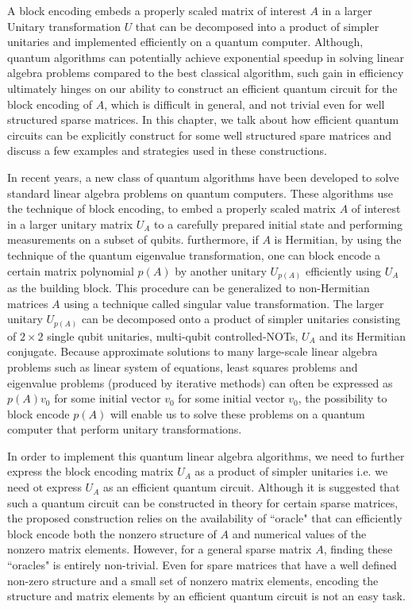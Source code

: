 \documentclass[12pt, oneside]{book}
\theoremstyle{definition}
\theoremstyle{definition}
\theoremstyle{remark}
\begin{document}
A block encoding embeds a properly scaled matrix of interest $A$ in a larger Unitary transformation $U$ that can be decomposed into a product of simpler unitaries and implemented efficiently on a quantum computer. Although, quantum algorithms can potentially achieve exponential speedup in solving linear algebra problems compared to the best classical algorithm, such gain in efficiency ultimately hinges on our ability to construct an efficient quantum circuit for the block encoding of $A$, which is difficult in general, and not trivial even for well structured sparse matrices. In this chapter, we talk about how efficient quantum circuits can be explicitly construct for some well structured spare matrices and discuss a few examples and strategies used in these constructions.

In recent years, a new class of quantum algorithms have been developed to solve standard linear algebra problems on quantum computers. These algorithms use the technique of block encoding, to embed a properly scaled matrix $A$ of interest in a larger unitary matrix $U_A$ to a carefully prepared initial state and performing measurements on a subset of qubits. furthermore, if $A$ is Hermitian, by using the technique of the quantum eigenvalue transformation, one can block encode a certain matrix polynomial $p(A)$ by another unitary $U_{p(A)}$ efficiently using $U_A$ as the building block. This procedure can be generalized to non-Hermitian matrices $A$ using a technique called singular value transformation. The larger unitary $U_{p(A)}$ can be decomposed onto a product of simpler unitaries consisting of $2\times 2$ single qubit unitaries, multi-qubit controlled-NOTs, $U_A$ and its Hermitian conjugate. Because approximate solutions to many large-scale linear algebra problems such as linear system of equations, least squares problems and eigenvalue problems (produced by iterative methods) can often be expressed as $p(A)v_0$ for some initial vector $v_0$ for some initial vector $v_0$, the possibility to block encode $p(A)$ will enable us to solve these problems on a quantum computer that perform unitary transformations. 

In order to implement this quantum linear algebra algorithms, we need to further express the block encoding matrix $U_A$ as a product of simpler unitaries i.e. we need ot express $U_A$ as an efficient quantum circuit. Although it is suggested that such a quantum circuit can be constructed in theory for certain sparse matrices, the proposed construction relies on the availability of ``oracle" that can efficiently block encode both the nonzero structure of $A$ and numerical values of the nonzero matrix elements. However, for a general sparse matrix $A$, finding these ``oracles" is entirely non-trivial. Even for spare matrices that have a well defined non-zero structure and a small set of nonzero matrix elements, encoding the structure and matrix elements by an efficient quantum circuit is not an easy task.
\end{document}
